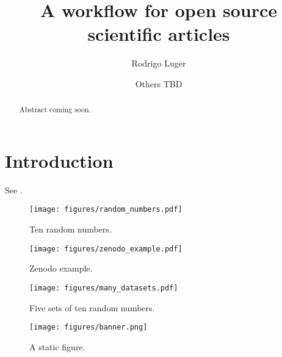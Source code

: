 \documentclass[twocolumn]{aastex631}
\begin{document}
\title{A workflow for open source scientific articles}

\author[0000-0002-0296-3826]{Rodrigo Luger}
\author{Others TBD}

\begin{abstract}
    Abstract coming soon.
\end{abstract}

\section{Introduction}
\label{sec:intro}

See \citet{Luger2021}.

\begin{figure}[ht!]
    \begin{centering}
        \texttt{[image: figures/random\_numbers.pdf]}
        \caption{Ten random numbers.}
        \label{fig:random_numbers}
    \end{centering}
\end{figure}

\begin{figure}[ht!]
    \begin{centering}
        \texttt{[image: figures/zenodo\_example.pdf]}
        \caption{Zenodo example.}
        \label{fig:zenodo_example}
    \end{centering}
\end{figure}

\begin{figure}[ht!]
    \begin{centering}
        \texttt{[image: figures/many\_datasets.pdf]}
        \caption{Five sets of ten random numbers.}
        \label{fig:many_datasets}
    \end{centering}
\end{figure}

\begin{figure}[th!]
    \begin{centering}
        \texttt{[image: figures/banner.png]}
        \caption{A static figure.}
        \label{fig:banner}
    \end{centering}
\end{figure}


\end{document}

